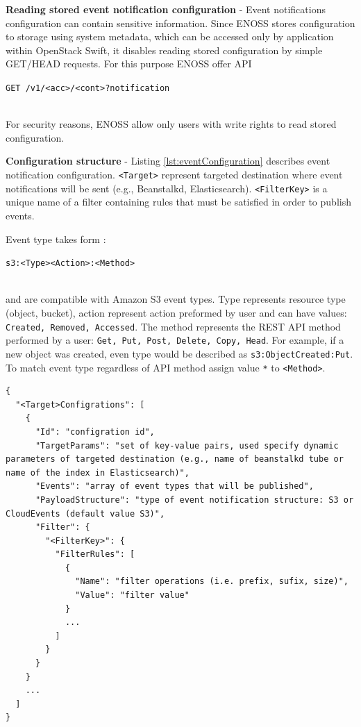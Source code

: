\documentclass{ExcelAtFIT}
\begin{document}
\textbf{Reading stored event notification configuration} - Event notifications configuration can contain sensitive information. Since ENOSS stores configuration to storage using system metadata, which can be accessed only by application within OpenStack Swift, it disables reading stored configuration by simple GET/HEAD requests. For this purpose ENOSS offer API \\\centerline{\texttt{GET /v1/<acc>/<cont>?notification}}\\For security reasons, ENOSS allow only users with write rights to read stored configuration.

\textbf{Configuration structure} - Listing \ref{lst:eventConfiguration} describes event notification configuration. \texttt{<Target>} represent targeted destination where event notifications will be sent (e.g., Beanstalkd, Elasticsearch). \texttt{<FilterKey>} is a unique name of a filter containing rules that must be satisfied in order to publish events.

Event type takes form :\\\centerline{\texttt{s3:<Type><Action>:<Method>}}\\ and are compatible with Amazon S3 event types. Type represents resource type (object, bucket), action represent action preformed by user and can have values: \texttt{Created, Removed, Accessed}. The method represents the REST API method performed by a user: \texttt{Get, Put, Post, Delete, Copy, Head}. For example, if a new object was created, even type would be described as \texttt{s3:ObjectCreated:Put}. To match event type regardless of API method assign value \texttt{*} to \texttt{<Method>}.

\begin{lstlisting}[style=jsonStyle, caption=Strucute of event notification configuration,    label=lst:eventConfiguration]
{
  "<Target>Configrations": [
    {
      "Id": "configration id",
      "TargetParams": "set of key-value pairs, used specify dynamic parameters of targeted destination (e.g., name of beanstalkd tube or name of the index in Elasticsearch)",
      "Events": "array of event types that will be published",
      "PayloadStructure": "type of event notification structure: S3 or CloudEvents (default value S3)",
      "Filter": {
        "<FilterKey>": {
          "FilterRules": [
            {
              "Name": "filter operations (i.e. prefix, sufix, size)",
              "Value": "filter value"
            }
            ...
          ]
        }
      }
    }
    ...
  ]
}
\end{lstlisting}
\end{document}
